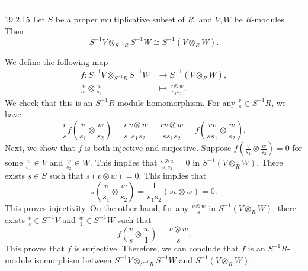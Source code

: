 \documentclass[letterpaper, 12pt]{article}
\begin{document}
\noindent\rule{7in}{2.8pt}
\begin{problem}{19.2.15}
Let \(S\) be a proper multiplicative subset of \(R\), and \(V, W\) be \(R\)-modules. Then 
\[S^{-1}V\otimes_{S^{-1}R}S^{-1}W\cong S^{-1}(V\otimes_R W).\]
\end{problem}
\begin{solution}
We define the following map 
\begin{align*}
    f:S^{-1}V\otimes_{S^{-1}R}S^{-1}W&\rightarrow S^{-1}(V\otimes_R W),\\ 
      \frac{v}{s_1}\otimes \frac{w}{s_2}&\mapsto \frac{v\otimes w}{s_1s_2}.
\end{align*}
We check that this is an \(S^{-1}R\)-module homomorphism. For any \(\frac{r}{s}\in S^{-1}R\), we have 
\[\frac{r}{s}f(\frac{v}{s_1}\otimes \frac{w}{s_2})=\frac{r}{s}\frac{v\otimes w}{s_1s_2}=\frac{rv\otimes w}{ss_1s_2}=f(\frac{rv}{ss_1}\otimes \frac{w}{s_2}).\]
Next, we show that \(f\) is both injective and surjective. Suppose \(f(\frac{v}{s_1}\otimes \frac{w}{s_2})=0\) for some \(\frac{v}{s_1}\in V\) and \(\frac{w}{s_2}\in W\). This implies that \(\frac{v\otimes w}{s_1s_2}=0\) in \(S^{-1}(V\otimes_R W)\). There exists \(s\in S\) such that \(s(v\otimes w)=0\). This implies that 
\[s(\frac{v}{s_1}\otimes\frac{w}{s_2})=\frac{1}{s_1s_2}(sv\otimes w)=0.\]
This proves injectivity. On the other hand, for any \(\frac{v\otimes w}{s}\) in \(S^{-1}(V\otimes_R W)\), there exists \(\frac{v}{s}\in S^{-1}V\) and \(\frac{w}{1}\in S^{-1}W\) such that 
\[f(\frac{v}{s}\otimes \frac{w}{1})=\frac{v\otimes w}{s}.\]
This proves that \(f\) is surjective. Therefore, we can conclude that \(f\) is an \(S^{-1}R\)-module isomorphism between \(S^{-1}V\otimes_{S^{-1}R}S^{-1}W\) and \(S^{-1}(V\otimes_R W)\).
\end{solution}
\end{document}
